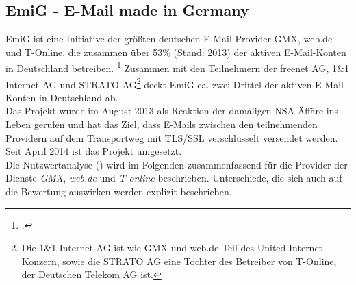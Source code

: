 \documentclass  [paper=a4,
				fontsize=12pt,
				listof=totoc,
				bibliography=totoc
				]{scrreprt}
\begin{document}
		
						
		
			\subsection{EmiG - E-Mail made in Germany}
			\ac{EmiG} ist eine Initiative der größten deutschen E-Mail-Provider GMX, web.de und T-Online, die zusammen über 53\% (Stand: 2013) der aktiven E-Mail-Konten in Deutschland betreiben.
			\footcite[Vgl.][]{Brandt13} 
			Zusammen mit den Teilnehmern der freenet AG, 1\&1 Internet AG und STRATO AG\footnote{Die 1\&1 Internet AG ist wie GMX und web.de Teil des United-Internet-Konzern, sowie die STRATO AG eine Tochter des Betreiber von T-Online, der Deutschen Telekom AG ist.} deckt EmiG ca. zwei Drittel der aktiven E-Mail-Konten in Deutschland ab.\\
			Das Projekt wurde im August 2013 als Reaktion der damaligen \ac{NSA}-Äffäre ins Leben gerufen und hat das Ziel, dass E-Mails zwischen den teilnehmenden Providern auf dem Transportweg mit \ac{TLS/SSL} verschlüsselt versendet werden.
			Seit April 2014 ist das Projekt umgesetzt.
			\medskip\\
			Die Nutzwertanalyse () wird im Folgenden zusammenfassend für die Provider der Dienste \textit{GMX}, \textit{web.de} und \textit{T-online} beschrieben. 
			Unterschiede, die sich auch auf die Bewertung auswirken werden explizit beschrieben.
\end{document}
